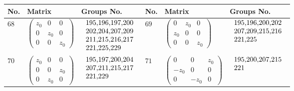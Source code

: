 \begin{table}[H]
\begin{center}
\begin{scriptsize}
\begin{tabular}{|l|l|l|l|l|l|} \hline
No. & Matrix & Groups No. & No. & Matrix & Groups No. \\ \hline \hline
$68$ & $\left(\begin{array}{rrr}
z_{0} & 0 & 0 \\
0 & z_{0} & 0 \\
0 & 0 & z_{0}
\end{array}\right)$ & $\begin{tabular}{l}
195,196,197,200 \\
202,204,207,209 \\
211,215,216,217 \\
221,225,229 \\
\end{tabular}$ & $69$ & $\left(\begin{array}{rrr}
0 & z_{0} & 0 \\
z_{0} & 0 & 0 \\
0 & 0 & z_{0}
\end{array}\right)$ & $\begin{tabular}{l}
195,196,200,202 \\
207,209,215,216 \\
221,225 \\
\end{tabular}$ \\ \hline
$70$ & $\left(\begin{array}{rrr}
z_{0} & 0 & 0 \\
0 & 0 & z_{0} \\
0 & z_{0} & 0
\end{array}\right)$ & $\begin{tabular}{l}
195,197,200,204 \\
207,211,215,217 \\
221,229 \\
\end{tabular}$ & $71$ & $\left(\begin{array}{rrr}
0 & 0 & z_{0} \\
-z_{0} & 0 & 0 \\
0 & -z_{0} & 0
\end{array}\right)$ & $\begin{tabular}{l}
195,200,207,215 \\
221 \\
\end{tabular}$ \\ \hline

\end{tabular}
\end{scriptsize}
\end{center}
\end{table}
